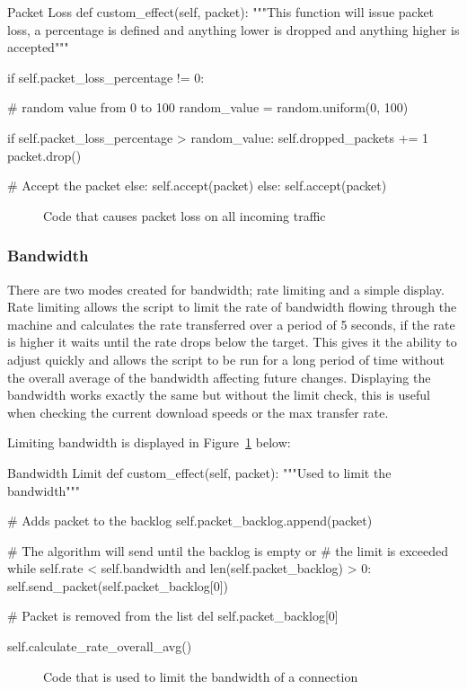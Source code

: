 \begin{Code}{Packet Loss}
def custom_effect(self, packet):
        """This function will issue packet loss,
           a percentage is defined and anything
           lower is dropped and anything higher is accepted"""

        if self.packet_loss_percentage != 0:

            # random value from 0 to 100
            random_value = random.uniform(0, 100)

            if self.packet_loss_percentage > random_value:
                self.dropped_packets += 1
                packet.drop()

            # Accept the packet
            else:
                self.accept(packet)
        else:
            self.accept(packet)
\end{Code}
\begin{figure}[h]
	\caption{Code that causes packet loss on all incoming traffic}
\end{figure}

\subsubsection{Bandwidth}
There are two modes created for bandwidth; rate limiting and a simple display. Rate limiting allows the script to limit the rate of bandwidth flowing through the machine and calculates the rate transferred over a period of 5 seconds, if the rate is higher it waits until the rate drops below the target. This gives it the ability to adjust quickly and allows the script to be run for a long period of time without the overall average of the bandwidth affecting future changes. Displaying the bandwidth works exactly the same but without the limit check, this is useful when checking the current download speeds or the max transfer rate.

Limiting bandwidth is displayed in Figure~\ref{ref:BandwidthCode} below:

\begin{Code}{Bandwidth Limit}
def custom_effect(self, packet):
	"""Used to limit the bandwidth"""

	# Adds packet to the backlog
	self.packet_backlog.append(packet)
	
	# The algorithm will send until the backlog is empty or 
	# the limit is exceeded
	while self.rate < self.bandwidth and len(self.packet_backlog) > 0:
		self.send_packet(self.packet_backlog[0])
            
		# Packet is removed from the list
		del self.packet_backlog[0]
			
		self.calculate_rate_overall_avg()
\end{Code}
\begin{figure}[h]
	\caption{Code that is used to limit the bandwidth of a connection}
	\label{ref:BandwidthCode}
\end{figure}

